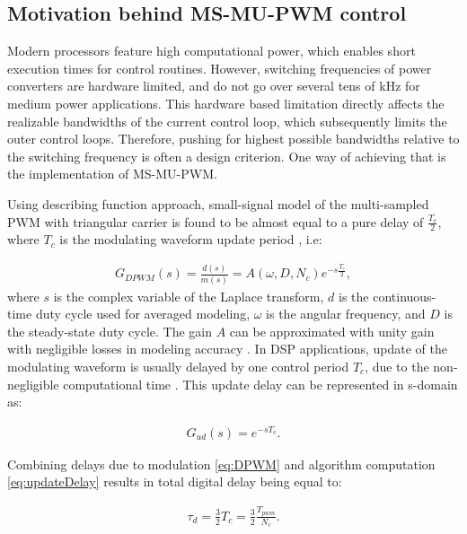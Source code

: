 \documentclass[conference]{IEEEtran}
\begin{document}
\subsection{Motivation behind MS-MU-PWM control}

Modern processors feature high computational power, which enables short execution times for control routines. However, switching frequencies of power converters are hardware limited, and do not go over several tens of kHz for medium power applications. This hardware based limitation directly affects the realizable bandwidths of the current control loop, which subsequently limits the outer control loops. Therefore, pushing for highest possible bandwidths relative to the switching frequency is often a design criterion. One way of achieving that is the implementation of MS-MU-PWM.

Using describing function approach, small-signal model of the multi-sampled PWM with triangular carrier is found to be almost equal to a pure delay of $\frac{T_c}{2}$, where $T_c$ is the modulating waveform update period \cite{corradini2018}, i.e:

\begin{equation}
\begin{aligned}
G_{DPWM} (s) = \frac{d(s)}{m(s)} = A(\omega,D,N_c) e^{-s\frac{T_c}{2}},
\label{eq:DPWM} 
\end{aligned}    
\end{equation}
where $s$ is the complex variable of the Laplace transform, $d$ is the continuous-time duty cycle used for averaged modeling, $\omega$ is the angular frequency, and $D$ is the steady-state duty cycle. The gain $A$ can be approximated with unity gain with negligible losses in modeling accuracy \cite{corradini2018}.
In DSP applications, update of the modulating waveform is usually delayed by one control period $T_c$, due to the non-negligible computational time \cite{Buso2015}. This update delay can be represented in s-domain as:

\begin{equation}
\begin{aligned}
G_{ud} (s) = e^{-sT_c}.
\label{eq:updateDelay} 
\end{aligned} 
\end{equation}

Combining delays due to modulation \eqref{eq:DPWM} and algorithm computation \eqref{eq:updateDelay} results in total digital delay being equal to:

\begin{equation}
\begin{aligned}
\tau_{d} = \frac{3}{2}T_c = \frac{3}{2} \frac{T_{pwm}}{N_c}.
\label{eq:tauD} 
\end{aligned}    
\end{equation}
\end{document}
